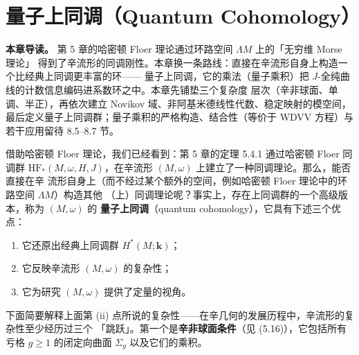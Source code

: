 
\chapter{量子上同调（Quantum Cohomology）}

\textbf{本章导读。} 第 5 章的哈密顿 Floer 理论通过环路空间 $\Lambda M$ 上的「无穷维 Morse 理论」
得到了辛流形的同调刚性。本章换一条路线：直接在辛流形自身上构造一个比经典上同调更丰富的环——
量子上同调，它的乘法（量子乘积）把 $J$-全纯曲线的计数信息编码进系数环之中。本章先铺垫三个复杂度
层次（辛非球面、单调、半正），再依次建立 Novikov 域、非阿基米德线性代数、稳定映射的模空间，
最后定义量子上同调群；量子乘积的严格构造、结合性（等价于 WDVV 方程）与若干应用留待 8.5–8.7 节。

借助哈密顿 Floer 理论，我们已经看到：第 5 章的定理 5.4.1 通过哈密顿 Floer 同调群
$\mathrm{HF}_*(M,\omega,H,J)$，在辛流形 $(M,\omega)$ 上建立了一种同调理论。那么，能否直接在辛
流形自身上（而不经过某个额外的空间，例如哈密顿 Floer 理论中的环路空间 $\Lambda M$）构造其他
（上）同调理论呢？事实上，存在上同调群的一个高级版本，称为 $(M,\omega)$ 的
\textbf{量子上同调}（quantum cohomology），它具有下述三个优点：
\begin{enumerate}[label=(\roman*)]
  \item 它还原出经典上同调群 $H^*(M;\mathbf{k})$；
  \item 它反映辛流形 $(M,\omega)$ 的复杂性；
  \item 它为研究 $(M,\omega)$ 提供了定量的视角。
\end{enumerate}

下面简要解释上面第 (ii) 点所说的复杂性——在辛几何的发展历程中，辛流形的复杂性至少经历过三个
「跳跃」。第一个是\textbf{辛非球面条件}（见 (5.16)），它包括所有亏格 $g\geqslant1$ 的闭定向曲面
$\Sigma_g$ 以及它们的乘积。

